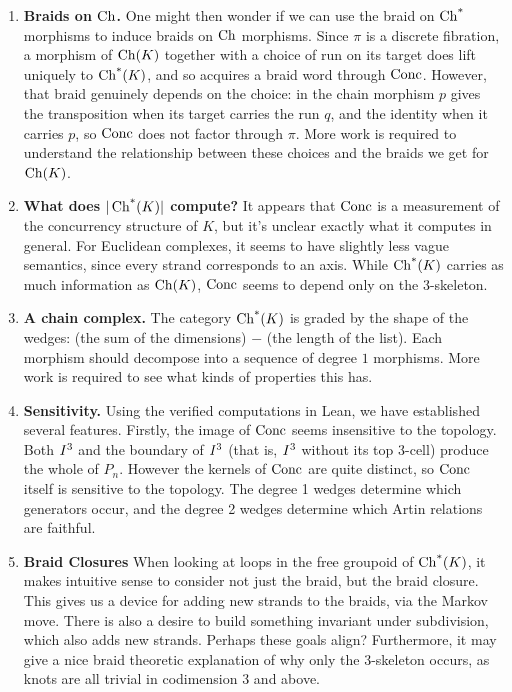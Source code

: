 \documentclass[11pt]{article}
\begin{document}
\begin{enumerate}
  \item\label{item:fibration} \textbf{Braids on $\operatorname{Ch}$.}
  One might then wonder if we can use the braid on $\operatorname{Ch^*}$ morphisms to induce braids on $\operatorname{Ch}$
  morphisms.
  Since $\pi$ is a discrete fibration, a morphism of $\operatorname{Ch}(K)$ together with a choice of run on its
  target does lift uniquely to $\operatorname{Ch^*}(K)$, and so acquires a braid word through $\operatorname{Conc}$.
  However, that braid genuinely depends on the choice:
  in  the chain morphism $p$ gives the transposition when its target 
  carries the run $q$, and the identity when it carries $p$, so $\operatorname{Conc}$ does not factor through $\pi$. 
  More work is required to understand the relationship between these choices 
  and the braids we get for $\operatorname{Ch}(K)$.
  
  \item\label{item:geometric} \textbf{What does $|\operatorname{Ch^*}(K)|$ compute?} It appears that $\operatorname{Conc}$ is 
        a measurement of the concurrency structure of $K$, but it's unclear exactly 
        what it computes in general. For Euclidean complexes, it seems to have slightly
        less vague semantics, since every strand corresponds to an axis.
        While $\operatorname{Ch^*}(K)$ carries as much information as $\operatorname{Ch}(K)$, $\operatorname{Conc}$ seems to depend only on
        the 3-skeleton.

  \item\label{item:grading} \textbf{A chain complex.} The category $\operatorname{Ch^*}(K)$ is graded by the shape
        of the wedges: (the sum of the dimensions) $-$ (the length of the list). Each morphism
        should decompose into a sequence of degree $1$ morphisms. More work is required to 
        see what kinds of properties this has.

  \item\label{item:sensitivity} \textbf{Sensitivity.} Using the verified computations in Lean, 
      we have established several features. Firstly, the image of $\operatorname{Conc}$ seems insensitive
      to the topology. Both $I^{3}$ and the boundary of $I^{3}$ (that is, $I^{3}$ without its top 3-cell)
      produce the whole of $P_n$.
      However the kernels of $\operatorname{Conc}$ are quite distinct, so $\operatorname{Conc}$ itself is sensitive to the topology.
      The degree 1 wedges determine which generators occur, and the degree 2 wedges determine which
      Artin relations are faithful.

  \item\label{item:subdivision} \textbf{Braid Closures} 
      When looking at loops in the free groupoid of $\operatorname{Ch^*}(K)$, it makes intuitive sense
      to consider not just the braid, but the braid closure.
      This gives us a device for adding new strands to the braids, via the Markov move.
      There is also a desire to build something invariant under subdivision, which 
      also adds new strands. Perhaps these goals align?
      Furthermore, it may give a nice braid theoretic explanation of why only the 3-skeleton occurs,
      as knots are all trivial in codimension 3 and above.

\end{enumerate}

\printbibliography
\end{document}
